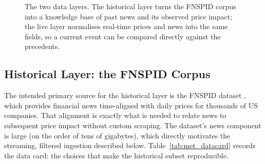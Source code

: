 \begin{figure}[ht]
\centering
{}
\caption[The two data layers]{The two data layers. The historical layer turns the FNSPID corpus into a
knowledge base of past news and its observed price impact; the live layer normalises real-time prices and
news into the same fields, so a current event can be compared directly against the precedents.}
\label{fig:data_layers}
\end{figure}

\subsection{Historical Layer: the FNSPID Corpus}
\label{sec:met_data_fnspid}

The intended primary source for the historical layer is the FNSPID dataset \autocite{dong2024fnspid},
which provides financial news time-aligned with daily prices for thousands of US companies. That alignment
is exactly what is needed to relate news to subsequent price impact without custom scraping. The dataset's
news component is large (on the order of tens of gigabytes), which directly motivates the streaming,
filtered ingestion described below. Table~\ref{tab:met_datacard} records the data card: the choices that
make the historical subset reproducible.


